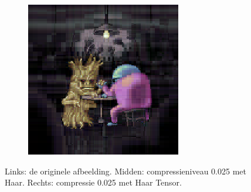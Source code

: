 \begin{figure}
\begin{subfigure}[t]{0.32\textwidth}
	\end{subfigure}
	\begin{subfigure}[t]{0.32\textwidth}
	\includegraphics[width=\linewidth]{plaatjes/bonkers_haar_t_0_025.png}
	\end{subfigure}
	\caption{Links: de originele afbeelding. Midden: compressieniveau 0.025 met Haar. Rechts: compressie 0.025 met Haar Tensor.}
	\label{fig:tensor_end}
\end{figure}
\restoregeometry
\pagebreak
